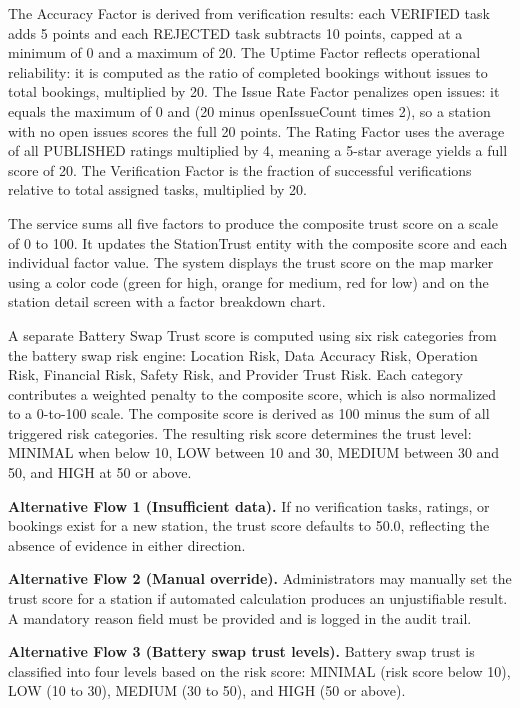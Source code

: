 \documentclass[../Main.tex]{subfiles}
\begin{document}
The Accuracy Factor is derived from verification results: each VERIFIED task adds 5 points and each REJECTED task subtracts 10 points, capped at a minimum of 0 and a maximum of 20. The Uptime Factor reflects operational reliability: it is computed as the ratio of completed bookings without issues to total bookings, multiplied by 20. The Issue Rate Factor penalizes open issues: it equals the maximum of 0 and (20 minus openIssueCount times 2), so a station with no open issues scores the full 20 points. The Rating Factor uses the average of all PUBLISHED ratings multiplied by 4, meaning a 5-star average yields a full score of 20. The Verification Factor is the fraction of successful verifications relative to total assigned tasks, multiplied by 20.

The service sums all five factors to produce the composite trust score on a scale of 0 to 100. It updates the StationTrust entity with the composite score and each individual factor value. The system displays the trust score on the map marker using a color code (green for high, orange for medium, red for low) and on the station detail screen with a factor breakdown chart.

A separate Battery Swap Trust score is computed using six risk categories from the battery swap risk engine: Location Risk, Data Accuracy Risk, Operation Risk, Financial Risk, Safety Risk, and Provider Trust Risk. Each category contributes a weighted penalty to the composite score, which is also normalized to a 0-to-100 scale. The composite score is derived as 100 minus the sum of all triggered risk categories. The resulting risk score determines the trust level: MINIMAL when below 10, LOW between 10 and 30, MEDIUM between 30 and 50, and HIGH at 50 or above.

\textbf{Alternative Flow 1 (Insufficient data).} If no verification tasks, ratings, or bookings exist for a new station, the trust score defaults to 50.0, reflecting the absence of evidence in either direction.

\textbf{Alternative Flow 2 (Manual override).} Administrators may manually set the trust score for a station if automated calculation produces an unjustifiable result. A mandatory reason field must be provided and is logged in the audit trail.

\textbf{Alternative Flow 3 (Battery swap trust levels).} Battery swap trust is classified into four levels based on the risk score: MINIMAL (risk score below 10), LOW (10 to 30), MEDIUM (30 to 50), and HIGH (50 or above).
\end{document}

